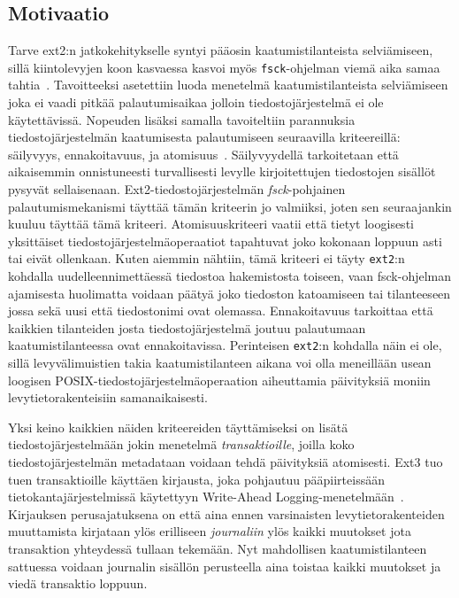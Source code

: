 \subsection{Motivaatio}

Tarve ext2:n jatkokehitykselle syntyi pääosin kaatumistilanteista selviämiseen,
sillä kiintolevyjen koon kasvaessa kasvoi myös \texttt{fsck}-ohjelman viemä aika samaa tahtia~\cite{Ext2Journal}.
Tavoitteeksi asetettiin luoda menetelmä kaatumistilanteista selviämiseen joka ei vaadi pitkää palautumisaikaa jolloin tiedostojärjestelmä ei ole käytettävissä.
Nopeuden lisäksi samalla tavoiteltiin parannuksia tiedostojärjestelmän kaatumisesta palautumiseen seuraavilla kriteereillä: säilyvyys, ennakoitavuus, ja atomisuus~\cite{Ext2Journal}.
Säilyvyydellä tarkoitetaan että aikaisemmin onnistuneesti turvallisesti levylle kirjoitettujen tiedostojen sisällöt pysyvät sellaisenaan.
Ext2-tiedostojärjestelmän \emph{fsck}-pohjainen palautumismekanismi täyttää tämän kriteerin jo valmiiksi,
joten sen seuraajankin kuuluu täyttää tämä kriteeri.
Atomisuuskriteeri vaatii että tietyt loogisesti yksittäiset tiedostojärjestelmäoperaatiot tapahtuvat
joko kokonaan loppuun asti tai eivät ollenkaan.
Kuten aiemmin nähtiin, tämä kriteeri ei täyty \texttt{ext2}:n kohdalla uudelleennimettäessä tiedostoa hakemistosta toiseen,
vaan fsck-ohjelman ajamisesta huolimatta voidaan päätyä joko tiedoston katoamiseen tai tilanteeseen jossa sekä uusi että tiedostonimi ovat olemassa.
Ennakoitavuus tarkoittaa että kaikkien tilanteiden josta tiedostojärjestelmä joutuu palautumaan kaatumistilanteessa ovat ennakoitavissa.
Perinteisen \texttt{ext2}:n kohdalla näin ei ole,
sillä levyvälimuistien takia kaatumistilanteen aikana voi olla meneillään usean loogisen POSIX-tiedostojärjestelmäoperaation aiheuttamia päivityksiä moniin levytietorakenteisiin samanaikaisesti.

Yksi keino kaikkien näiden kriteereiden täyttämiseksi on lisätä tiedostojärjestelmään jokin menetelmä \emph{transaktioille}, joilla koko tiedostojärjestelmän metadataan voidaan tehdä päivityksiä atomisesti.
Ext3 tuo tuen transaktioille käyttäen kirjausta, joka pohjautuu pääpiirteissään tietokantajärjestelmissä käytettyyn Write-Ahead Logging-menetelmään~\cite{AriesWal}.
Kirjauksen perusajatuksena on että aina ennen varsinaisten levytietorakenteiden muuttamista kirjataan ylös erilliseen \emph{journaliin} ylös kaikki muutokset jota transaktion yhteydessä tullaan tekemään.
Nyt mahdollisen kaatumistilanteen sattuessa voidaan journalin sisällön perusteella aina toistaa kaikki muutokset ja viedä transaktio loppuun.

